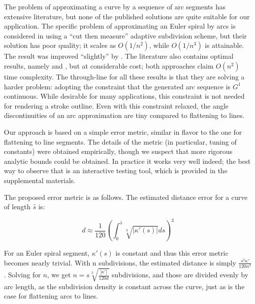 \documentclass[sigconf, authordraft]{acmart}
\begin{document}
The problem of approximating a curve by a sequence of arc segments has extensive literature, but none of the published solutions are quite suitable for our application. The specific problem of approximating an Euler spiral by arcs is considered in \citet{Meek2004} using a ``cut then measure'' adaptive subdivision scheme, but their solution has poor quality; it scales as $O(1/n^2)$, while $O(1/n^3)$ is attainable. The result was improved ``slightly'' by \citet{Narayan2014}. The literature also contains optimal results, namely \citet{Maier2014} and \citet{Nuntawisuttiwong2021}, but at considerable cost; both approaches claim $O(n^2)$ time complexity. The through-line for all these results is that they are solving a harder problem: adopting the constraint that the generated arc sequence is $G^1$ continuous. While desirable for many applications, this constraint is not needed for rendering a stroke outline. Even with this constraint relaxed, the angle discontinuities of an arc approximation are tiny compared to flattening to lines.


Our approach is based on a simple error metric, similar in flavor to the one for flattening to line segments. The details of the metric (in particular, tuning of constants) were obtained empirically, though we suspect that more rigorous analytic bounds could be obtained. In practice it works very well indeed; the best way to observe that is an interactive testing tool, which is provided in the supplemental materials.

The proposed error metric is as follows. The estimated distance error for a curve of length $\hat{s}$ is:

\[
    d \approx \frac{1}{120}\left(\int_0^{\hat{s}} \sqrt[3]{|\kappa'(s)|}ds \right)^3
\]

For an Euler spiral segment, $\kappa'(s)$ is constant and thus this error metric becomes nearly trivial. With n subdivisions, the estimated distance is simply $\frac{s^3\kappa'}{120n^3}$. Solving for $n$, we get $n = s\sqrt[3]{\frac{|\kappa'|}{120d}}$ subdivisions, and those are divided evenly by arc length, as the subdivision density is constant across the curve, just as is the case for flattening arcs to lines.
\end{document}
